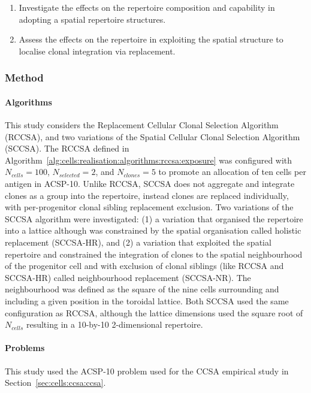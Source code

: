 \begin{enumerate}
	\item Investigate the effects on the repertoire composition and capability in adopting a spatial repertoire structures.
	\item Assess the effects on the repertoire in exploiting the spatial structure to localise clonal integration via replacement.
\end{enumerate}

%
%
\subsubsection{Method}

%
%
\paragraph{Algorithms}
This study considers the Replacement Cellular Clonal Selection Algorithm (RCCSA), and two variations of the Spatial Cellular Clonal Selection Algorithm (SCCSA).
The RCCSA defined in  Algorithm~\ref{alg:cells:realisation:algorithms:rccsa:exposure} was configured with $N_{cells}=100$, $N_{selected}=2$, and $N_{clones}=5$ to promote an allocation of ten cells per antigen in ACSP-10.
Unlike RCCSA, SCCSA does not aggregate and integrate clones as a group into the repertoire, instead clones are replaced individually, with per-progenitor clonal sibling replacement exclusion. Two variations of the SCCSA algorithm were investigated: (1) a variation that organised the repertoire into a lattice although was constrained by the spatial organisation called holistic replacement (SCCSA-HR), and (2) a variation that exploited the spatial repertoire and constrained the integration of clones to the spatial neighbourhood of the progenitor cell and with exclusion of clonal siblings (like RCCSA and SCCSA-HR) called neighbourhood replacement (SCCSA-NR). The neighbourhood was defined as the square of the nine cells surrounding and including a given position in the toroidal lattice. Both SCCSA used the same configuration as RCCSA, although the lattice dimensions used the square root of $N_{cells}$ resulting in a 10-by-10 2-dimensional repertoire.

%
%
\paragraph{Problems}
This study used the ACSP-10 problem used for the CCSA empirical study in Section~\ref{sec:cells:ccsa:ccsa}.

